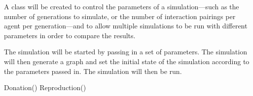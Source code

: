 A class will be created to control the parameters of a simulation---such
as the number of generations to simulate, or the number of interaction
pairings per agent per generation---and to allow multiple simulations to
be run with different parameters in order to compare the results.

The simulation will be started by passing in a set of parameters.
The simulation will then generate a graph and set the initial state of
the simulation according to the parameters passed in.
The simulation will then be run.

\begin{algorithmic}
    \State Donation()
    \State Reproduction()
\EndWhile
\end{algorithmic}
